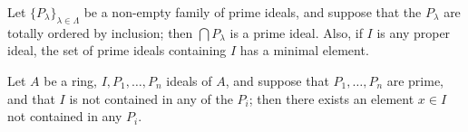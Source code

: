 \begin{exercise}\label{ex:1.5-ex}
Let $\{P_\lambda\}_{\lambda \in \Lambda}$ be a non-empty family of prime ideals, and suppose that the $P_\lambda$
are totally ordered by inclusion; then $\bigcap P_\lambda$ is a prime ideal. Also, if $I$ is
any proper ideal, the set of prime ideals containing $I$ has a minimal element.
\end{exercise}

\begin{exercise}\label{ex:1.6-ex}
Let $A$ be a ring, $I, P_1, \ldots, P_n$ ideals of $A$, and suppose that $P_1, \ldots, P_n$ are
prime, and that $I$ is not contained in any of the $P_i$; then there exists an
element $x \in I$ not contained in any $P_i$.
\end{exercise}
